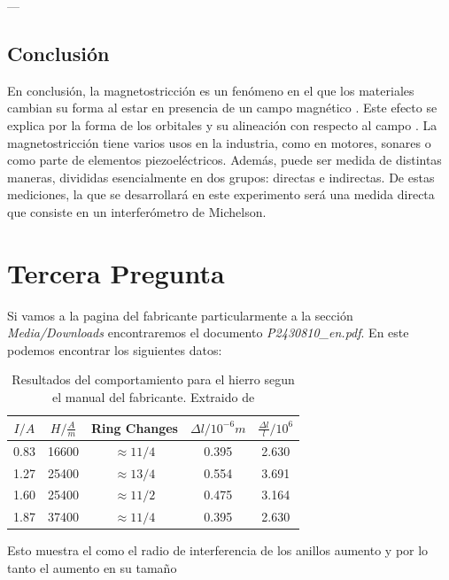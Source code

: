 \documentclass[a4paper, amsfonts, amssymb, amsmath, reprint, showkeys, nofootinbib, twoside]{revtex4-1}
\begin{document}
---

\subsection{Conclusi\'{o}n}

En conclusi\'{o}n, la magnetostricci\'{o}n es un fen\'{o}meno en el que los materiales cambian su forma al estar en presencia de un campo magn\'{e}tico \cite{Ekreem_2007}. Este efecto se explica por la forma de los orbitales y su alineaci\'{o}n con respecto al campo \cite{Ekreem_2007}. La magnetostricci\'{o}n tiene varios usos en la industria, como en motores, sonares o como parte de elementos piezoel\'{e}ctricos. Adem\'{a}s, puede ser medida de distintas maneras, divididas esencialmente en dos grupos: directas e indirectas. De estas mediciones, la que se desarrollar\'{a} en este experimento ser\'{a} una medida directa que consiste en un interfer\'{o}metro de Michelson.

\section{Tercera Pregunta}

Si vamos a la pagina del fabricante particularmente a la sección \textit{Media/Downloads} encontraremos el documento \textit{P2430810\_en.pdf}. En este podemos encontrar los siguientes datos:

\begin{table}[H]
  \caption{\label{tab:iron} Resultados del comportamiento para el hierro segun el manual del fabricante. Extraido de \cite{Guia}}
  \begin{ruledtabular}
    \begin{tabular}{ccccc}
      $I/A$ & $H/\frac{A}{m}$ & Ring Changes & $\Delta l / 10^{-6}m$ & $\frac{\Delta l}{l}/10^6$\\
      \hline
      0.83 & 16600 & $\approx 11/4$ & 0.395 & 2.630 \\
      1.27 & 25400 & $\approx 13/4$ & 0.554 & 3.691 \\
      1.60 & 25400 & $\approx 11/2$ & 0.475 & 3.164 \\
      1.87 & 37400 & $\approx 11/4$ & 0.395 & 2.630 \\
    \end{tabular}
  \end{ruledtabular}
\end{table}

Esto muestra el como el radio de interferencia de los anillos aumento y por lo tanto el aumento en su tamaño \cite{Guia}
\end{document}
